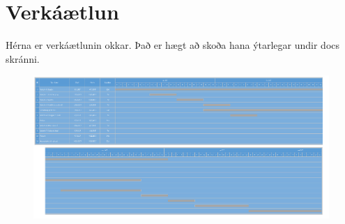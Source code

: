 \section{Verkáætlun}
Hérna er verkáætlunin okkar. Það er hægt að skoða hana ýtarlegar undir docs skránni.

\begin{figure}[h]
\includegraphics[scale=.3]{img/gant.png}
\end{figure}